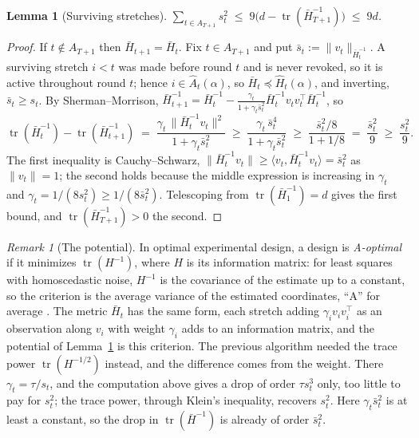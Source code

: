 \documentclass[11pt]{article}
\theoremstyle{plain}
\newtheorem{lemma}[theorem]{Lemma}
\theoremstyle{definition}
\theoremstyle{remark}
\newtheorem{remark}[theorem]{Remark}
\DeclareMathOperator{\tr}{tr}
\newcommand{\ip}[2]{\langle #1, #2\rangle}
\begin{document}
\begin{lemma}[Surviving stretches]\label{lem:potential}
$\displaystyle\sum_{t\in A_{T+1}}s_t^{2}\;\le\;9\bigl(d-\tr(\bar H_{T+1}^{-1})\bigr)\;\le\;9d$.
\end{lemma}

\begin{proof}
If $t\notin A_{T+1}$ then $\bar H_{t+1}=\bar H_t$. Fix $t\in A_{T+1}$ and put
$\bar s_t:=\|v_t\|_{\bar H_t^{-1}}$. A surviving stretch $i<t$ was made before round $t$ and is never
revoked, so it is active throughout round $t$; hence $i\in\hat A_t(\alpha)$, so
$\bar H_t\preceq\hat H_t(\alpha)$, and inverting, $\bar s_t\ge s_t$. By Sherman--Morrison,
$\bar H_{t+1}^{-1}=\bar H_t^{-1}-\tfrac{\gamma_t}{1+\gamma_t\bar s_t^{2}}\bar H_t^{-1}v_tv_t^{\top}\bar
H_t^{-1}$, so
\[
  \tr(\bar H_t^{-1})-\tr(\bar H_{t+1}^{-1})
  \;=\;\frac{\gamma_t\,\|\bar H_t^{-1}v_t\|^{2}}{1+\gamma_t\bar s_t^{2}}
  \;\ge\;\frac{\gamma_t\,\bar s_t^{4}}{1+\gamma_t\bar s_t^{2}}
  \;\ge\;\frac{\bar s_t^{2}/8}{1+1/8}\;=\;\frac{\bar s_t^{2}}{9}\;\ge\;\frac{s_t^{2}}{9} .
\]
The first inequality is Cauchy--Schwarz, $\|\bar H_t^{-1}v_t\|\ge\ip{v_t}{\bar H_t^{-1}v_t}=\bar
s_t^{2}$ as $\|v_t\|=1$; the second holds because the middle expression is increasing in $\gamma_t$
and $\gamma_t=1/(8s_t^{2})\ge1/(8\bar s_t^{2})$. Telescoping from $\tr(\bar H_1^{-1})=d$ gives the
first bound, and $\tr(\bar H_{T+1}^{-1})>0$ the second.
\end{proof}

\begin{remark}[The potential]\label{rem:potential}
In optimal experimental design, a design is \emph{A-optimal} if it minimizes $\tr(H^{-1})$, where
$H$ is its information matrix: for least squares with homoscedastic noise, $H^{-1}$ is the
covariance of the estimate up to a constant, so the criterion is the average variance of the
estimated coordinates, ``A'' for average \cite{Kiefer74,Pukelsheim93}. The metric $\bar H_t$ has
the same form, each stretch adding $\gamma_iv_iv_i^{\top}$ as an observation along $v_i$ with weight
$\gamma_i$ adds to an information matrix, and the potential of Lemma~\ref{lem:potential} is this
criterion. The previous algorithm \cite{Cai26} needed the trace power $\tr(H^{-1/2})$ instead, and
the difference comes from the weight. There $\gamma_t=\tau/s_t$, and the computation above gives a
drop of order $\tau s_t^{3}$ only, too little to pay for $s_t^{2}$; the trace power, through Klein's
inequality, recovers $s_t^{2}$. Here $\gamma_t\bar s_t^{2}$ is at least a constant, so the drop in
$\tr(\bar H^{-1})$ is already of order $\bar s_t^{2}$.
\end{remark}
\end{document}
